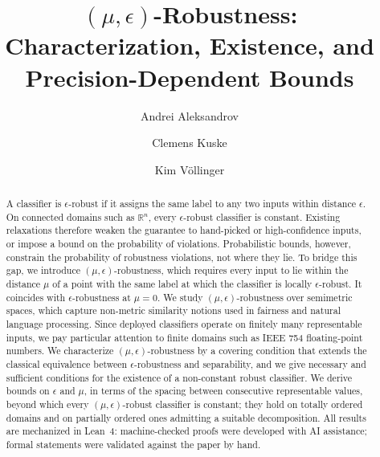 \documentclass[runningheads]{llncs}
\begin{document}
%
\title{$(\mu,\epsilon)$-Robustness: Characterization, Existence, and Precision-Dependent Bounds}
%
%
\author{Andrei Aleksandrov \and
Clemens Kuske \and
Kim Völlinger}
%
%
%
\maketitle              %
%
\begin{abstract}
A classifier is $\epsilon$-robust if it assigns the same label to any two inputs within distance $\epsilon$.
On connected domains such as $\mathbb{R}^n$, every $\epsilon$-robust classifier is constant.
Existing relaxations therefore weaken the guarantee to hand-picked or high-confidence inputs, or impose a bound on the probability of violations.
Probabilistic bounds, however, constrain the probability of robustness violations, not where they lie.
To bridge this gap, we introduce $(\mu,\epsilon)$-robustness, which requires every input to lie within the distance $\mu$ of a point with the same label at which the classifier is locally $\epsilon$-robust. It coincides with $\epsilon$-robustness at $\mu=0$.
We study $(\mu,\epsilon)$-robustness over semimetric spaces, which capture non-metric similarity notions used in fairness and natural language processing. 
Since deployed classifiers operate on finitely many representable inputs, we pay particular attention to finite domains such as IEEE 754 floating-point numbers.
We characterize $(\mu,\epsilon)$-robustness by a covering condition that extends the classical equivalence between $\epsilon$-robustness and separability, and we give necessary and sufficient conditions for the existence of a non-constant robust classifier.
We derive bounds on $\epsilon$ and $\mu$, in terms of the spacing between consecutive representable values, beyond which every $(\mu, \epsilon)$-robust classifier is constant; 
they hold on totally ordered domains and on partially ordered ones admitting a suitable decomposition.
All results are mechanized in Lean~4: machine-checked proofs were developed with AI assistance; formal statements were validated against the paper by hand.

\end{abstract}
\end{document}

